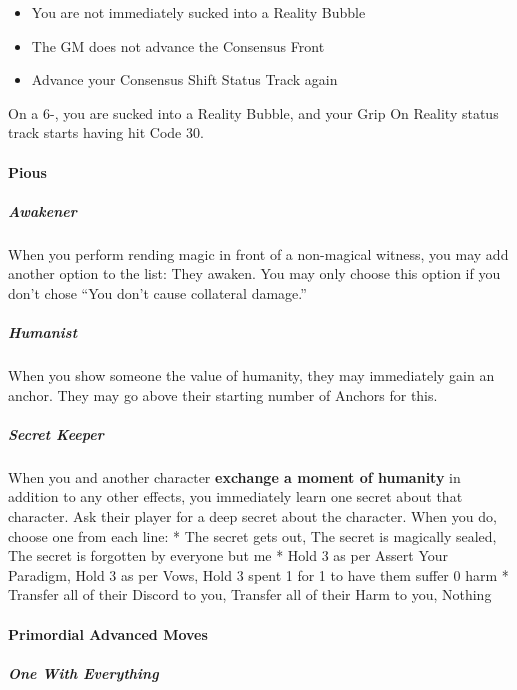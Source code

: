 \documentclass[
]{article}
\begin{document}
\begin{itemize}
\item
  You are not immediately sucked into a Reality Bubble
\item
  The GM does not advance the Consensus Front
\item
  Advance your Consensus Shift Status Track again
\end{itemize}

On a 6-, you are sucked into a Reality Bubble, and your Grip On Reality
status track starts having hit Code 30.

\hypertarget{pious}{%
\paragraph{Pious}\label{pious}}

\hypertarget{awakener}{%
\subparagraph{Awakener}\label{awakener}}

When you perform rending magic in front of a non-magical witness, you
may add another option to the list: They awaken. You may only choose
this option if you don't chose ``You don't cause collateral damage.''

\hypertarget{humanist}{%
\subparagraph{Humanist}\label{humanist}}

When you show someone the value of humanity, they may immediately gain
an anchor. They may go above their starting number of Anchors for this.

\hypertarget{secret-keeper}{%
\subparagraph{Secret Keeper}\label{secret-keeper}}

When you and another character \textbf{exchange a moment of humanity} in
addition to any other effects, you immediately learn one secret about
that character. Ask their player for a deep secret about the character.
When you do, choose one from each line: * The secret gets out, The
secret is magically sealed, The secret is forgotten by everyone but me *
Hold 3 as per Assert Your Paradigm, Hold 3 as per Vows, Hold 3 spent 1
for 1 to have them suffer 0 harm * Transfer all of their Discord to you,
Transfer all of their Harm to you, Nothing

\hypertarget{primordial-advanced-moves}{%
\paragraph{Primordial Advanced Moves}\label{primordial-advanced-moves}}

\hypertarget{one-with-everything}{%
\subparagraph{One With Everything}\label{one-with-everything}}
\end{document}
